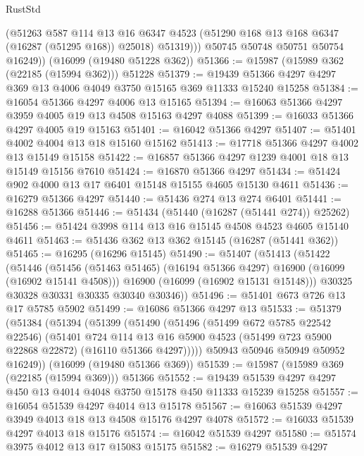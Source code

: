 \begin{lexlean}{RustStd}
\begin{coremodule}
            (@51263
              @587
              @114
              @13
              @16
              @6347
              @4523
              (@51290 @168 @13 @168 @6347 (@16287 (@51295 @168)) @25018)
              @51319)))
        @50745
        @50748
        @50751
        @50754
        @16249))
    (@16099 (@19480 @51228 @362))
@51366 := @15987 (@15989 @362 (@22185 (@15994 @362))) @51228
@51379 := @19439 @51366 @4297 @4297 @369 @13 @4006 @4049 @3750 @15165 @369 @11333 @15240 @15258
@51384 := @16054 @51366 @4297 @4006 @13 @15165
@51394 := @16063 @51366 @4297 @3959 @4005 @19 @13 @4508 @15163 @4297 @4088
@51399 := @16033 @51366 @4297 @4005 @19 @15163
@51401 := @16042 @51366 @4297
@51407 := @51401 @4002 @4004 @13 @18 @15160 @15162
@51413 := @17718 @51366 @4297 @4002 @13 @15149 @15158
@51422 := @16857 @51366 @4297 @1239 @4001 @18 @13 @15149 @15156 @7610
@51424 := @16870 @51366 @4297
@51434 := @51424 @902 @4000 @13 @17 @6401 @15148 @15155 @4605 @15130 @4611
@51436 := @16279 @51366 @4297
@51440 := @51436 @274 @13 @274 @6401
@51441 := @16288 @51366
@51446 := @51434 (@51440 (@16287 (@51441 @274)) @25262)
@51456 := @51424 @3998 @114 @13 @16 @15145 @4508 @4523 @4605 @15140 @4611
@51463 := @51436 @362 @13 @362 @15145 (@16287 (@51441 @362))
@51465 := @16295 (@16296 @15145)
@51490 := @51407
    (@51413
      (@51422
        (@51446
          (@51456 (@51463 @51465) (@16194 @51366 @4297) @16900 (@16099 (@16902 @15141 @4508)))
          @16900
          (@16099 (@16902 @15131 @15148)))
        @30325
        @30328
        @30331
        @30335
        @30340
        @30346))
@51496 := @51401 @673 @726 @13 @17 @5785 @5902
@51499 := @16086 @51366 @4297 @13
@51533 := @51379
    (@51384
      (@51394
        (@51399
          (@51490
            (@51496
              (@51499 @672 @5785 @22542 @22546)
              (@51401
                @724
                @114
                @13
                @16
                @5900
                @4523
                (@51499 @723 @5900 @22868 @22872)
                (@16110 @51366 @4297)))))
        @50943
        @50946
        @50949
        @50952
        @16249))
    (@16099 (@19480 @51366 @369))
@51539 := @15987 (@15989 @369 (@22185 (@15994 @369))) @51366
@51552 := @19439 @51539 @4297 @4297 @450 @13 @4014 @4048 @3750 @15178 @450 @11333 @15239 @15258
@51557 := @16054 @51539 @4297 @4014 @13 @15178
@51567 := @16063 @51539 @4297 @3949 @4013 @18 @13 @4508 @15176 @4297 @4078
@51572 := @16033 @51539 @4297 @4013 @18 @15176
@51574 := @16042 @51539 @4297
@51580 := @51574 @3975 @4012 @13 @17 @15083 @15175
@51582 := @16279 @51539 @4297

\end{coremodule}
\end{lexlean}
